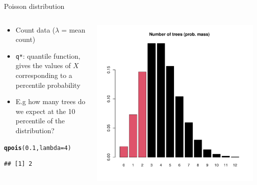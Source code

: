 \documentclass[aspectratio=169]{beamer}\usepackage[]{graphicx}\usepackage[]{color}
\makeatletter
\def\maxwidth{ %
  \ifdim\Gin@nat@width>\linewidth
    \linewidth
  \else
    \Gin@nat@width
  \fi
}
\newcommand{\hlnum}[1]{\textcolor[rgb]{0.686,0.059,0.569}{#1}}%
\newcommand{\hlstd}[1]{\textcolor[rgb]{0.345,0.345,0.345}{#1}}%
\newcommand{\hlkwc}[1]{\textcolor[rgb]{0.333,0.667,0.333}{#1}}%
\newcommand{\hlkwd}[1]{\textcolor[rgb]{0.737,0.353,0.396}{\textbf{#1}}}%
\newenvironment{kframe}{%
 \def\at@end@of@kframe{}%
 \ifinner\ifhmode%
  \def\at@end@of@kframe{\end{minipage}}%
  \begin{minipage}{\columnwidth}%
 \fi\fi%
 \def\FrameCommand##1{\hskip\@totalleftmargin \hskip-\fboxsep
 \colorbox{shadecolor}{##1}\hskip-\fboxsep
     \hskip-\linewidth \hskip-\@totalleftmargin \hskip\columnwidth}%
 \MakeFramed {\advance\hsize-\width
   \@totalleftmargin\z@ \linewidth\hsize
   \@setminipage}}%
 {\par\unskip\endMakeFramed%
 \at@end@of@kframe}
\newenvironment{knitrout}{}{} %
\makeatother
\begin{document}
\begin{frame}[fragile]{Poisson distribution}
\begin{columns}
  \begin{column}{0.5\textwidth}
  \begin{itemize}
    \item Count data ($\lambda$ = mean count)
    \item \texttt{q*}: quantile function, gives the values of $X$ corresponding to a percentile probability
    \item E.g how many trees do we expect at the 10 percentile of the distribution?
  \end{itemize}
\begin{knitrout}\scriptsize
{}\color{fgcolor}\begin{kframe}
\begin{alltt}
\hlkwd{qpois}\hlstd{(}\hlnum{0.1}\hlstd{,}\hlkwc{lambda}\hlstd{=}\hlnum{4}\hlstd{)}
\end{alltt}
\begin{verbatim}
## [1] 2
\end{verbatim}
\end{kframe}
\end{knitrout}
  \end{column}
  \begin{column}{0.5\textwidth}
\begin{knitrout}\scriptsize
{}\color{fgcolor}
\includegraphics[width=\maxwidth]{figure/unnamed-chunk-6-1} 

\end{knitrout}
  \end{column}
\end{columns}
\end{frame}
\end{document}
